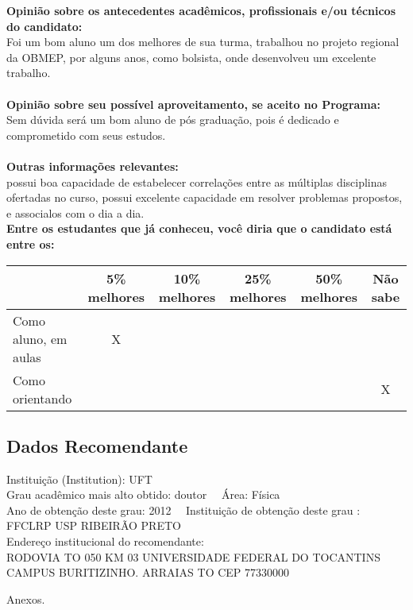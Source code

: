 \documentclass[11pt]{article}
\begin{document}
\textbf{Opinião sobre os antecedentes acadêmicos, profissionais e/ou técnicos do candidato:}
\\Foi um bom aluno um dos melhores de sua turma, trabalhou no projeto regional da OBMEP, por alguns anos, como bolsista, onde desenvolveu um excelente trabalho.\\
\\
\textbf{Opinião sobre seu possível aproveitamento, se aceito no Programa:}
\\Sem dúvida será um bom aluno de pós graduação, pois é dedicado e comprometido com seus estudos.\\ 
\\
\textbf{Outras informações relevantes:} \\possui boa capacidade de estabelecer correlações entre as múltiplas disciplinas ofertadas no curso, possui excelente capacidade em resolver problemas propostos, e associalos com o dia a dia.
\\[0.3cm]
\textbf{Entre os estudantes que já conheceu, você diria que o candidato está entre os:}
\\
\begin{tabular}{|l|c|c|c|c|c|}
\hline
 & 5\% melhores & 10\% melhores & 25\% melhores & 50\% melhores & Não sabe \\
\hline
Como aluno, em aulas & X &  &  &  & \\
\hline
Como orientando &  &  &  &  & X\\
\hline
\end{tabular}
\subsection*{Dados Recomendante} 
	Instituição (Institution): UFT
\\ 
	Grau acadêmico mais alto obtido: doutor
	\ \ Área: Física
	\\
	Ano de obtenção deste grau: 2012
	\ \ 
	Instituição de obtenção deste grau : FFCLRP USP RIBEIRÃO PRETO
	\\ 
	Endereço institucional do recomendante: \\ RODOVIA TO 050 KM 03 UNIVERSIDADE FEDERAL DO TOCANTINS CAMPUS BURITIZINHO. 
ARRAIAS TO
CEP 77330000 
\begin{center}
Anexos.
\end{center}
\end{document}
